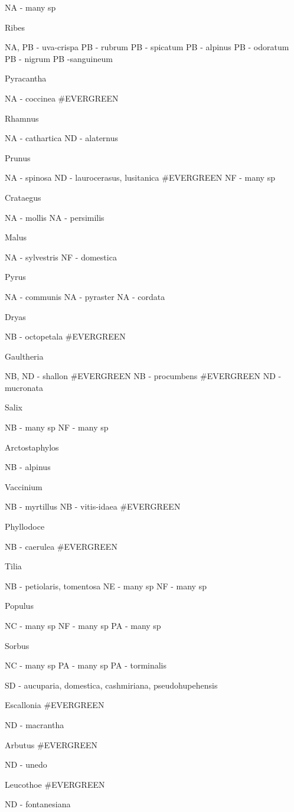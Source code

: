 \documentclass[openany]{book}
\begin{document}
NA - many sp

Ribes

NA, PB - uva-crispa PB - rubrum PB - spicatum PB - alpinus PB - odoratum
PB - nigrum PB -sanguineum

Pyracantha

NA - coccinea \#EVERGREEN

Rhamnus

NA - cathartica ND - alaternus

Prunus

NA - spinosa ND - laurocerasus, lusitanica \#EVERGREEN NF - many sp

Crataegus

NA - mollis NA - persimilis

Malus

NA - sylvestris NF - domestica

Pyrus

NA - communis NA - pyraster NA - cordata

Dryas

NB - octopetala \#EVERGREEN

Gaultheria

NB, ND - shallon \#EVERGREEN NB - procumbens \#EVERGREEN ND - mucronata

Salix

NB - many sp NF - many sp

Arctostaphylos

NB - alpinus

Vaccinium

NB - myrtillus NB - vitis-idaea \#EVERGREEN

Phyllodoce

NB - caerulea \#EVERGREEN

Tilia

NB - petiolaris, tomentosa NE - many sp NF - many sp

Populus

NC - many sp NF - many sp PA - many sp

Sorbus

NC - many sp PA - many sp PA - torminalis

SD - aucuparia, domestica, cashmiriana, pseudohupehensis

Escallonia \#EVERGREEN

ND - macrantha

Arbutus \#EVERGREEN

ND - unedo

Leucothoe \#EVERGREEN

ND - fontanesiana
\end{document}
